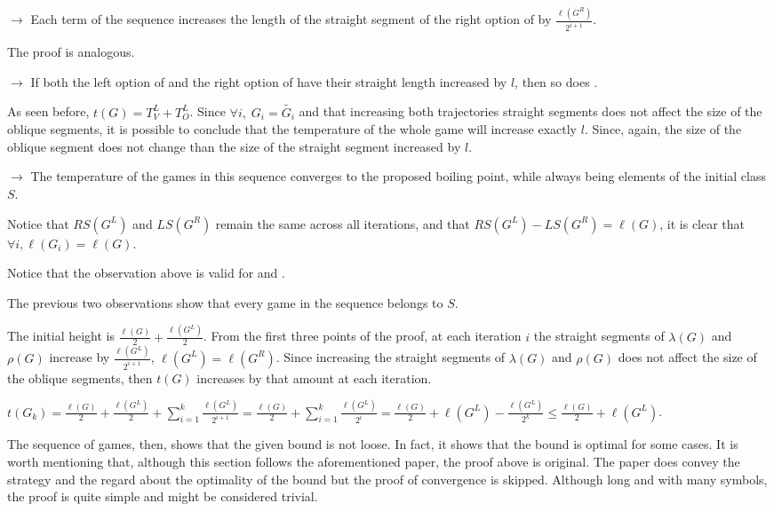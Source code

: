 \begin{list}{}{}
	\item[$\rightarrow$] Each term of the sequence increases the length of the straight segment of the right option of  by $\frac{\ell(G^R)}{2^{i+1}}$.
	\item[ ] The proof is analogous.
	\item[$\rightarrow$] If both the left option of  and the right option of  have their straight length increased by $l$, then so does \Gm{}.
	\item[ ] As seen before, $t(G) = T^L_V + T^L_O$. Since $\forall i,\; G_i = \tilde{G_i}$ and that increasing both trajectories straight segments does not affect the size of the oblique segments, it is possible to conclude that the temperature of the whole game will increase exactly $l$. Since, again, the size of the oblique segment does not change than the size of the straight segment increased by $l$.
	\item[$\rightarrow$] The temperature of the games in this sequence converges to the proposed boiling point, while always being elements of the initial class $S$.
	\item[ ] Notice that $RS(G^L)$ and $LS(G^R)$ remain the same across all iterations, and that $RS(G^L) - LS(G^R) = \ell(G)$, it is clear that $\forall i, \ell(G_i) = \ell(G)$.
	\item[ ] Notice that the observation above is valid for  and .
	\item[ ] The previous two observations show that every game in the sequence belongs to $S$.
	\item[ ] The initial height is $\frac{\ell(G)}{2} + \frac{\ell(G^L)}{2}$. From the first three points of the proof, at each iteration $i$ the straight segments of $\lambda(G)$ and $\rho(G)$ increase by $\frac{\ell(G^L)}{2^{i+1}}$, $\ell(G^L) = \ell(G^R)$. Since increasing the straight segments of $\lambda(G)$ and $\rho(G)$ does not affect the size of the oblique segments, then $t(G)$ increases by that amount at each iteration.
	\item[] \hspace{-1cm} $t(G_k) = \frac{\ell(G)}{2} + \frac{\ell(G^L)}{2} + \sum\limits_{i=1}^{k} \frac{\ell(G^L)}{2^{i+1}} = \frac{\ell(G)}{2} + \sum\limits_{i=1}^{k} \frac{\ell(G^L)}{2^{i}} = \frac{\ell(G)}{2} + \ell(G^L) - \frac{\ell(G^L)}{2^k} \leq \frac{\ell(G)}{2} + \ell(G^L)$.
\end{list}

The sequence of games, then, shows that the given bound is not loose. In fact, it shows that the bound is optimal for some cases. It is worth mentioning that, although this section follows the aforementioned paper, the proof above is original. The paper does convey the strategy and the regard about the optimality of the bound but the proof of convergence is skipped. Although long and with many symbols, the proof is quite simple and might be considered trivial.

